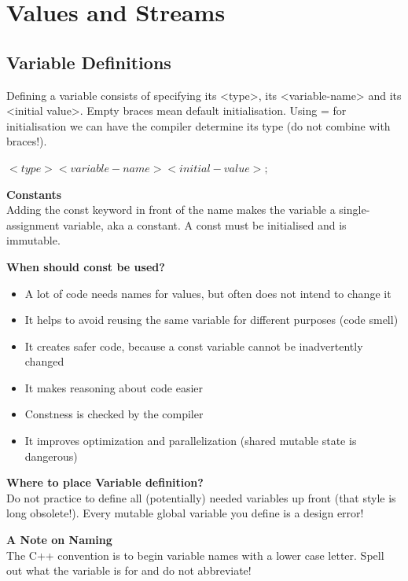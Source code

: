 
\section{Values and Streams}

\subsection{Variable Definitions}
Defining a variable consists of specifying its <type>, its <variable-name> and its <initial value>. Empty braces mean default initialisation. Using = for initialisation we can have the compiler determine its type (do not combine with braces!).
\begin{center}
$<type> <variable-name> {<initial-value>};$
\end{center}
\textbf{Constants}\\
 Adding the const keyword in front of the name makes the variable a single-assignment variable, aka a constant. A const must be initialised and is immutable.

\textbf{When should const be used?}
\begin{itemize}
  \itemsep -0.5em 
  \item A lot of code needs names for values, but often does not intend to change it
  \item  It helps to avoid reusing the same variable for different purposes (code smell)
  \item  It creates safer code, because a const variable cannot be inadvertently changed
  \item It makes reasoning about code easier
  \item  Constness is checked by the compiler
  \item  It improves optimization and parallelization (shared mutable state is dangerous) 
\end{itemize}

\textbf{Where to place Variable definition?}\\
Do not practice to define all (potentially) needed variables up front (that style is long obsolete!). Every mutable global variable you define is a design error!

\textbf{A Note on Naming}\\
The C++ convention is to begin variable names with a lower case letter. Spell out what the variable is for and do not abbreviate!

